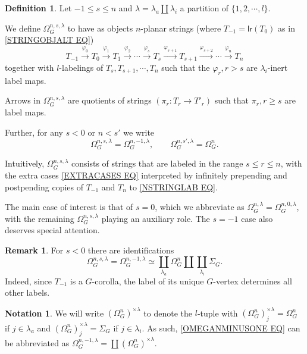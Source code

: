 \documentclass[a4paper,10pt
,draft
]{article}%
\numberwithin{equation}{section}
\numberwithin{figure}{section}
\theoremstyle{definition} %
\newtheorem{definition}[equation]{Definition}%
\newtheorem{remark}[equation]{Remark}%
\newtheorem{notation}[equation]{Notation}%
\newcommand{\1}{\ensuremath{\mathbbm 1}}%
\begin{document}
\begin{definition}
Let $-1 \leq s \leq n$ and 
$\lambda = \lambda_a \amalg \lambda_i$
a partition of $\{1,2,\cdots,l\}$.

We define $\Omega_{G}^{n,s,\lambda}$ to have as objects $n$-planar strings (where $T_{-1} = \mathsf{lr}(T_0)$ as in \eqref{STRINGOBJALT EQ})
\begin{equation}\label{NSTRINGLAB EQ}
	T_{-1} \xrightarrow{\varphi_0}
	T_0 \xrightarrow{\varphi_1}
	T_1 \xrightarrow{\varphi_2}
	\cdots \xrightarrow{\varphi_s}
	T_s \xrightarrow{\varphi_{s+1}}
	T_{s+1} \xrightarrow{\varphi_{s+2}}
	\cdots \xrightarrow{\varphi_n}
	T_{n}
\end{equation}
together with
$l$-labelings of $T_s, T_{s+1},\cdots, T_{n}$ such that the $\varphi_r,r>s$ are $\lambda_i$-inert label maps.

Arrows in $\Omega_{G}^{n,s,\lambda}$ are quotients of strings
$(\pi_r \colon T_r \to T'_r)$ such that 
$\pi_r, r\geq s$ are label maps.

Further, for any $s<0$ or $n<s'$ we write
\begin{equation}\label{EXTRACASES EQ}
	\Omega_{G}^{n,s,\lambda} = 
		\Omega_{G}^{n,-1,\lambda},
\qquad
	\Omega_{G}^{n,s',\lambda} = \Omega_{G}^{n}.
\end{equation}
\end{definition}

Intuitively, $\Omega_G^{n,s,\lambda}$ consists of strings that are labeled in the range $s \leq r \leq n$,
with the extra cases \eqref{EXTRACASES EQ} interpreted by infinitely prepending and postpending copies of $T_{-1}$ and $T_n$ to \eqref{NSTRINGLAB EQ}.

The main case of interest is that of $s=0$, which we abbreviate as $\Omega_{G}^{n,\lambda} = \Omega_{G}^{n,0,\lambda}$,
with the remaining
$\Omega_{G}^{n,s,\lambda}$ playing an auxiliary role.
The $s=-1$ case also deserves special attention.

\begin{remark}
	For $s<0$ there are identifications 
\begin{equation}\label{OMEGANMINUSONE EQ}
	\Omega_{G}^{n,s,\lambda} = 
	\Omega_{G}^{n,-1,\lambda} \simeq
		\coprod_{\lambda_a} \Omega_{G}^{n} \amalg
		\coprod_{\lambda_i} \Sigma_G.
\end{equation}
Indeed, since $T_{-1}$ is a $G$-corolla, the label of its unique $G$-vertex determines all other labels.
\end{remark}

\begin{notation}
We will write $(\Omega_G^n)^{\times \lambda}$ to denote the $l$-tuple with 
$(\Omega_G^n)^{\times \lambda}_j = \Omega_G^n$ if 
$j \in \lambda_a$ and
$(\Omega_G^n)^{\times \lambda}_j = \Sigma_G$ if
$j \in \lambda_i$.
As such, \eqref{OMEGANMINUSONE EQ} can be abbreviated as
$\Omega_{G}^{n,-1,\lambda} = \coprod (\Omega_G^n)^{\times \lambda}$.
\end{notation}
\end{document}
